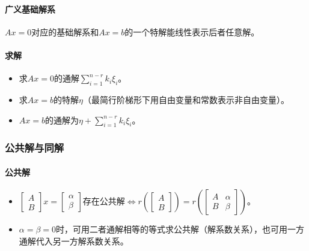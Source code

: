 \documentclass[
12pt, %
a4paper, 
oneside, %
]{scrartcl}
\begin{document}
\paragraph{广义基础解系}
$ Ax = 0 $对应的基础解系和$ Ax = b $的一个特解能线性表示后者任意解。
\paragraph{求解}
\begin{itemize}
\item 求$ Ax = 0 $的通解$ \sum_{i = 1}^{n - r} k_i \xi_i $。
\item 求$ Ax = b $的特解$ \eta $（最简行阶梯形下用自由变量和常数表示非自由变量）。
\item $ Ax = b $的通解为$ \eta + \sum_{i = 1}^{n - r} k_i \xi_i $。
\end{itemize}
\subsubsection[公共解与同解]{公共解与同解}
\paragraph{公共解}
\begin{itemize}
\item $ \begin{bmatrix} A \\ B \end{bmatrix} x = \begin{bmatrix} \alpha \\ \beta \end{bmatrix} $存在公共解$ \Leftrightarrow $$ r(\begin{bmatrix} A \\ B \end{bmatrix}) = r(\begin{bmatrix} A & \alpha \\ B & \beta \end{bmatrix}) $。
\item $ \alpha = \beta = 0 $时，可用二者通解相等的等式求公共解（解系数关系），也可用一方通解代入另一方解系数关系。
\end{itemize}
\end{document}
